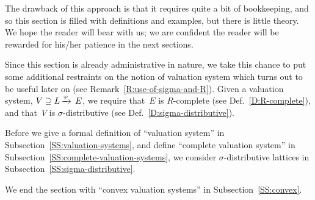 The drawback of this approach is that it requires
quite a bit of bookkeeping,
and so this section
is filled with definitions and examples,
but there is little theory.
We hope the reader will bear with us;
we are confident the reader will be rewarded
for his/her patience
in the next sections.

Since this section
 is already  administrative in nature,
we take this chance
to put 
 some additional restraints on
the notion of valuation system
which turns out to be useful later on
(see Remark~\ref{R:use-of-sigma-and-R}).
Given a valuation system,
$V \supseteq L\,\smash{\xrightarrow{\varphi}\,E}$,
we  require that~$E$ is $R$-complete
(see Def.~\ref{D:R-complete}),
and that~$V$ is $\sigma$-distributive
(see Def.~\ref{D:sigma-distributive}).

Before we give a formal definition
of ``valuation system'' 
in Subsection~\ref{SS:valuation-systems},
and define ``complete valuation system''
in Subsection~\ref{SS:complete-valuation-systems},
we consider $\sigma$-distributive lattices
in Subsection~\ref{SS:sigma-distributive}.

We end the section
with ``convex valuation systems''
 in Subsection~\ref{SS:convex}.
%
%
